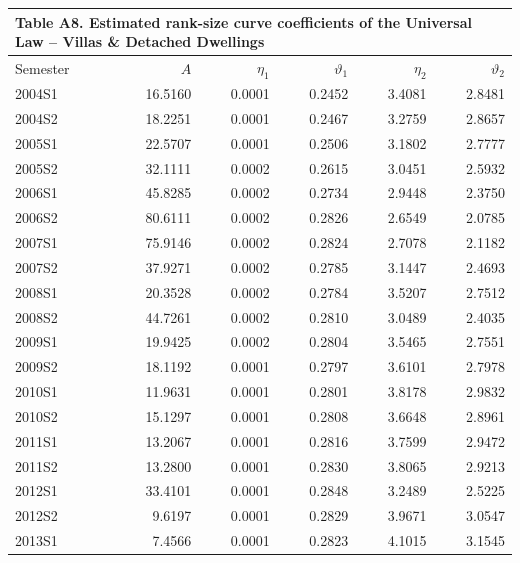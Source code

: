 \clearpage
\begin{landscape}
\begin{table}[!ht]
  \centering
  \footnotesize
  \setlength{\tabcolsep}{4pt}
  \renewcommand{\arraystretch}{0.80}
  \begin{tabular}{lrrrrr}
    \multicolumn{6}{l}{\small\textbf{Table A8. Estimated rank-size curve coefficients of the Universal Law -- Villas \& Detached Dwellings}} \\[3pt]
    \hline
    Semester & $A$ & $\eta_{1}$ & $\vartheta_{1}$ & $\eta_{2}$ & $\vartheta_{2}$ \\
    \hline
    2004S1 & 16.5160 & 0.0001 & 0.2452 & 3.4081 & 2.8481 \\
    2004S2 & 18.2251 & 0.0001 & 0.2467 & 3.2759 & 2.8657 \\
    2005S1 & 22.5707 & 0.0001 & 0.2506 & 3.1802 & 2.7777 \\
    2005S2 & 32.1111 & 0.0002 & 0.2615 & 3.0451 & 2.5932 \\
    2006S1 & 45.8285 & 0.0002 & 0.2734 & 2.9448 & 2.3750 \\
    2006S2 & 80.6111 & 0.0002 & 0.2826 & 2.6549 & 2.0785 \\
    2007S1 & 75.9146 & 0.0002 & 0.2824 & 2.7078 & 2.1182 \\
    2007S2 & 37.9271 & 0.0002 & 0.2785 & 3.1447 & 2.4693 \\
    2008S1 & 20.3528 & 0.0002 & 0.2784 & 3.5207 & 2.7512 \\
    2008S2 & 44.7261 & 0.0002 & 0.2810 & 3.0489 & 2.4035 \\
    2009S1 & 19.9425 & 0.0002 & 0.2804 & 3.5465 & 2.7551 \\
    2009S2 & 18.1192 & 0.0001 & 0.2797 & 3.6101 & 2.7978 \\
    2010S1 & 11.9631 & 0.0001 & 0.2801 & 3.8178 & 2.9832 \\
    2010S2 & 15.1297 & 0.0001 & 0.2808 & 3.6648 & 2.8961 \\
    2011S1 & 13.2067 & 0.0001 & 0.2816 & 3.7599 & 2.9472 \\
    2011S2 & 13.2800 & 0.0001 & 0.2830 & 3.8065 & 2.9213 \\
    2012S1 & 33.4101 & 0.0001 & 0.2848 & 3.2489 & 2.5225 \\
    2012S2 &  9.6197 & 0.0001 & 0.2829 & 3.9671 & 3.0547 \\
    2013S1 &  7.4566 & 0.0001 & 0.2823 & 4.1015 & 3.1545 \\

\end{tabular}
\end{table}
\end{landscape}
